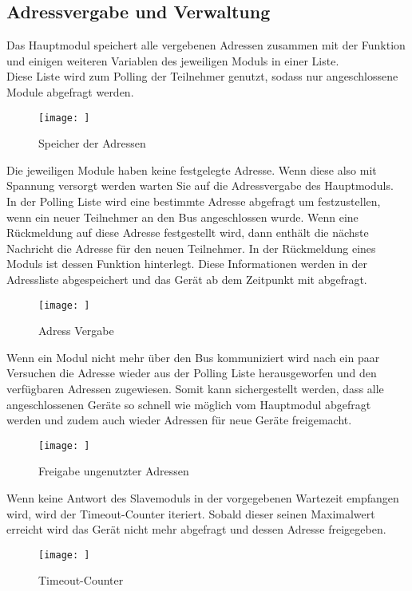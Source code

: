 \subsection{Adressvergabe und Verwaltung}
\textmd{Das Hauptmodul speichert alle vergebenen Adressen zusammen mit der Funktion und einigen weiteren Variablen des jeweiligen Moduls in einer Liste.\\
Diese Liste wird zum Polling der Teilnehmer genutzt, sodass nur angeschlossene Module abgefragt werden.\\}
\begin{figure}[H]
    \centering    
    \texttt{[image: ]}
    \caption{Speicher der Adressen}
    \label{Adress Speicher}
\end{figure}
\textmd{Die jeweiligen Module haben keine festgelegte Adresse. Wenn diese also mit Spannung versorgt werden warten Sie auf die Adressvergabe des Hauptmoduls.\\
In der Polling Liste wird eine bestimmte Adresse abgefragt um festzustellen, wenn ein neuer Teilnehmer an den Bus angeschlossen wurde. Wenn eine Rückmeldung auf diese Adresse festgestellt wird, dann enthält die nächste Nachricht die Adresse für den neuen Teilnehmer.
In der Rückmeldung eines Moduls ist dessen Funktion hinterlegt. Diese Informationen werden in der Adressliste abgespeichert und das Gerät ab dem Zeitpunkt mit abgefragt.\\
}
\begin{figure}[H]
    \centering    
    \texttt{[image: ]}
    \caption{Adress Vergabe}
    \label{newAdress()}
\end{figure}
\textmd{Wenn ein Modul nicht mehr über den Bus kommuniziert wird nach ein paar Versuchen die Adresse wieder aus der Polling Liste herausgeworfen und den verfügbaren Adressen zugewiesen. Somit kann sichergestellt werden, dass alle angeschlossenen Geräte so schnell wie möglich vom Hauptmodul abgefragt werden und zudem auch wieder Adressen für neue Geräte freigemacht.
}
\begin{figure}[H]
    \centering    
    \texttt{[image: ]}
    \caption{Freigabe ungenutzter Adressen}
    \label{freeAdress()}
\end{figure}
\textmd{Wenn keine Antwort des Slavemoduls in der vorgegebenen Wartezeit empfangen wird, wird der Timeout-Counter iteriert. Sobald dieser seinen Maximalwert erreicht wird das Gerät nicht mehr abgefragt und dessen Adresse freigegeben.
}
\begin{figure}[H]
    \centering    
    \texttt{[image: ]}
    \caption{Timeout-Counter}
    \label{timeout()}
\end{figure}


